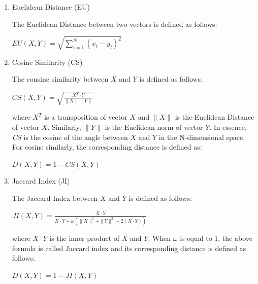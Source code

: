 \begin{enumerate}
\item Euclidean Distance (EU)

The Euclidean Distance between two vectors is defined as follows:
\begin{center}
$EU(\mathit{X}, \mathit{Y}) = \displaystyle \sqrt{\sum_{i=1}^{N} (x_i-y_i)^2}$
\end{center}


\item Cosine Similarity (CS)

The consine similarity between $\mathit{X}$ and $\mathit{Y}$ is defined as follows:

\begin{center}
$CS(\mathit{X}, \mathit{Y}) = \displaystyle \sqrt{\frac{\mathit{X}^T \cdot \mathit{Y}} {\| \mathit{X} \|\| \mathit{Y} \|}}$
\end{center}
where $\mathit{X}^T$ is a transposition of vector $\mathit{X}$ and $\| \mathit{X}\|$ is the Euclidean Distance of
vector $\mathit{X}$. Similarly, $\|\mathit{Y}\|$ is the Euclidean norm of vector $\mathit{Y}$. In essence, \textit{CS} is the cosine of the angle between $\mathit{X}$ and $\mathit{Y}$ in the N-dimensional space. For cosine similarly, the corresponding distance is defined as:

\begin{center}
$D(\mathit{X},\mathit{Y}) = 1 - CS(\mathit{X},\mathit{Y})$
\end{center}

\item Jaccard Index (JI)

The Jaccard Index between $\mathit{X}$ and $\mathit{Y}$ is defined as follows:

\begin{center}
$JI(\mathit{X}, \mathit{Y}) = \displaystyle \frac{\mathit{X} \cdot \mathit{Y}}{\mathit{X} \cdot \mathit{Y}+\omega(\|\mathit{X}\|^2+\|\mathit{Y}\|^2-2(\mathit{X} \cdot \mathit{Y}))}$
\end{center}

where $\mathit{X} \cdot \mathit{Y}$ is the inner product of $\mathit{X}$ and $\mathit{Y}$. 
When $\omega$ is equal to 1, the above formula is called Jaccard index and its corresponding distance is defined as follows:

\begin{center}
$D(\mathit{X},\mathit{Y}) = 1 - JI(\mathit{X},\mathit{Y})$
\end{center}

\end{enumerate}

